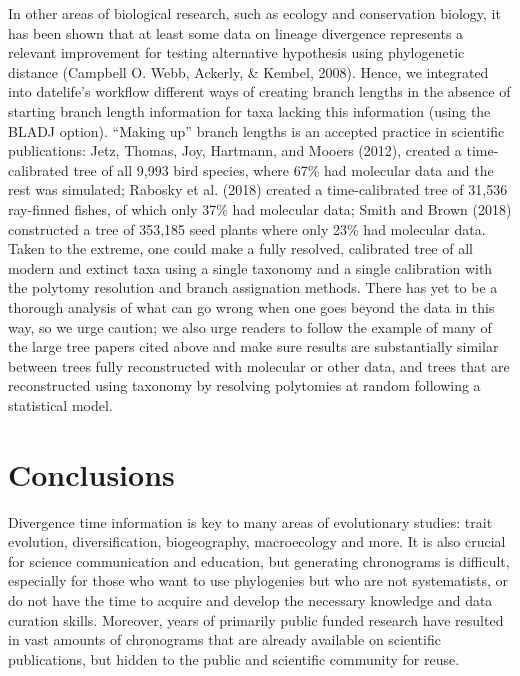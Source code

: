 \documentclass[
  english,
  man]{apa6}
\begin{document}
In other areas of biological research, such as ecology and conservation biology, it has been shown that at least some data on lineage divergence represents a relevant improvement for testing alternative hypothesis using phylogenetic distance (Campbell O. Webb, Ackerly, \& Kembel, 2008). Hence, we integrated into datelife's workflow different ways of creating branch lengths in the absence of starting branch length information for taxa lacking this information (using the BLADJ option). ``Making up'' branch lengths is an accepted practice in scientific publications: Jetz, Thomas, Joy, Hartmann, and Mooers (2012), created a time-calibrated tree of all 9,993 bird species, where 67\% had molecular data and the rest was simulated; Rabosky et al. (2018) created a time-calibrated tree of 31,536 ray-finned fishes, of which only 37\% had molecular data; Smith and Brown (2018) constructed a tree of 353,185 seed plants where only 23\% had molecular data. Taken to the extreme, one could make a fully resolved, calibrated tree of all modern and extinct taxa using a single taxonomy and a single calibration with the polytomy resolution and branch assignation methods. There has yet to be a thorough analysis of what can go wrong when one goes beyond the data in this way, so we urge caution; we also urge readers to follow the example of many of the large tree papers cited above and make sure results are substantially similar between trees fully reconstructed with molecular or other data, and trees that are reconstructed using taxonomy by resolving polytomies at random following a statistical model.

\hypertarget{conclusions}{%
\section{Conclusions}\label{conclusions}}

Divergence time information is key to many areas of evolutionary studies: trait evolution,
diversification, biogeography, macroecology and more. It is also crucial for science communication and education, but generating chronograms is difficult,
especially for those who want to use phylogenies but who are not systematists, or
do not have the time to acquire and develop the necessary knowledge and data curation skills. Moreover, years of primarily public funded research have resulted in vast amounts of chronograms that are already available on scientific publications, but hidden to the public and scientific community for reuse.
\end{document}
